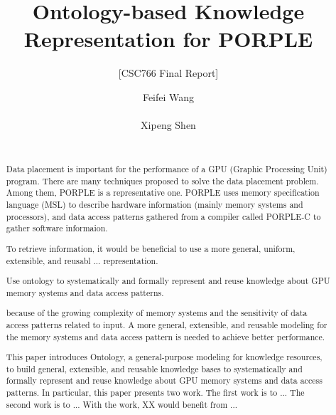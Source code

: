 \documentclass{sig-alternate}
\begin{document}

\title{Ontology-based Knowledge Representation for PORPLE}
\subtitle{[CSC766 Final Report]}

\author{
\alignauthor
Feifei Wang\\
       \\
\alignauthor
Xipeng Shen\\
       \\
}
\maketitle
\begin{abstract}
Data placement is important for the performance of a GPU (Graphic Processing Unit) program. There are many techniques proposed to solve the data placement problem. Among them, PORPLE is a representative one. PORPLE uses memory specification language (MSL) to describe hardware information (mainly memory systems and processors), and data access patterns gathered from a compiler called PORPLE-C to gather software informaion. 

To retrieve information, it would be beneficial to use a more general, uniform, extensible, and reusabl ... representation.

Use ontology to systematically and formally represent and reuse knowledge about GPU memory systems and data access patterns.
 
because of the growing complexity of memory systems and the sensitivity of data access patterns related to input. A more general, extensible, and reusable modeling for the memory systems and data access pattern is needed to achieve better performance.

This paper introduces Ontology, a general-purpose modeling for knowledge resources, to build general, extensible, and reusable knowledge bases to systematically and formally represent and reuse knowledge about GPU memory systems and data access patterns. In particular, this paper presents two work. The first work is to ... The second work is to ... With the work, XX would benefit from ...
\end{abstract}


\end{document}

